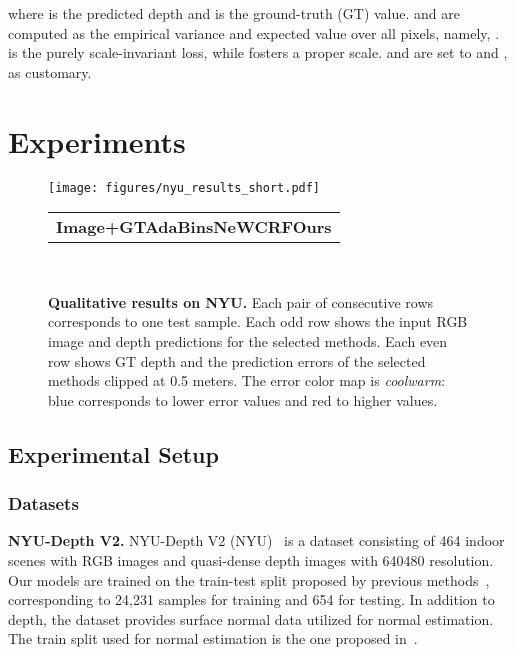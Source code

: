 where  is the predicted depth and  is the ground-truth (GT) value.  and  are computed as the empirical variance and expected value over all pixels, namely, .  is the purely scale-invariant loss, while  fosters a proper scale.  and  are set to  and , as customary. 

\section{Experiments}
\label{sec:experiments}
\begin{figure}
    \centering
    \texttt{[image: figures/nyu\_results\_short.pdf]}\\
    \footnotesize
    \begin{tabularx}{\columnwidth}{l}
        \hspace{0.02\columnwidth}\textbf{Image+GT}\hspace{0.09\columnwidth}\textbf{AdaBins}\cite{Bhat2020}\hspace{0.055\columnwidth}\textbf{NeWCRF}\cite{Yuan2022}\hspace{0.11\columnwidth}\textbf{Ours}
    \end{tabularx}\\
    \vspace{-5pt}
    \caption{\textbf{Qualitative results on NYU.} Each pair of consecutive rows corresponds to one test sample. Each odd row shows the input RGB image and depth predictions for the selected methods. Each even row shows GT depth and the prediction errors of the selected methods clipped at 0.5 meters. The error color map is \textit{coolwarm}: blue corresponds to lower error values and red to higher values.}
    \label{fig:nyu_results}
    \vspace{-10pt}
\end{figure}

\subsection{Experimental Setup}
\label{sec:experiments_expsetup}
\subsubsection{Datasets}

\noindent{}\textbf{NYU-Depth V2.} NYU-Depth V2 (NYU)~\cite{Silberman:ECCV12} is a dataset consisting of 464 indoor scenes with RGB images and quasi-dense depth images with 640480 resolution. Our models are trained on the train-test split proposed by previous methods~\cite{Lee2019}, corresponding to 24,231 samples for training and 654 for testing. In addition to depth, the dataset provides surface normal data utilized for normal estimation. The train split used for normal estimation is the one proposed in~\cite{Yin2019}.

